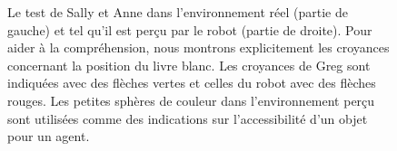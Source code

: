 \documentclass[a4paper,11pt,twoside]{StyleThese}
\begin{document}
\clearpage
    \begin{figure}[ht!]
  \begin{center}
 \end{center}
  \caption{Le test de Sally et Anne dans l'environnement réel (partie de gauche) et tel qu'il est perçu par le robot (partie de droite). Pour aider à la compréhension, nous montrons explicitement les croyances concernant la position du livre blanc. Les croyances de Greg sont indiquées avec des flèches vertes et celles du robot avec des flèches rouges.
Les petites sphères de couleur dans l'environnement perçu sont utilisées comme des indications sur l'accessibilité d'un objet pour un agent.}
  \label{SA}
\end{figure}
\end{document}
